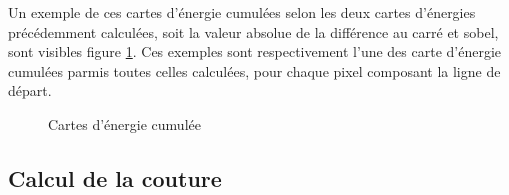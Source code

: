 \documentclass[a4paper]{article}
\begin{document}
Un exemple de ces cartes d'énergie cumulées selon les deux cartes d'énergies précédemment calculées, soit la
valeur absolue de la différence au carré et sobel, sont visibles figure \ref{ecum}. Ces exemples sont
respectivement l'une des carte d'énergie cumulées parmis toutes celles calculées, pour chaque pixel composant la ligne de départ.

\begin{figure}[!ht]%
    \centering
    \hspace{0.030\textwidth}
    \caption{Cartes d'énergie cumulée}
    \label{ecum}
\end{figure}

\subsection{Calcul de la couture}
\end{document}
